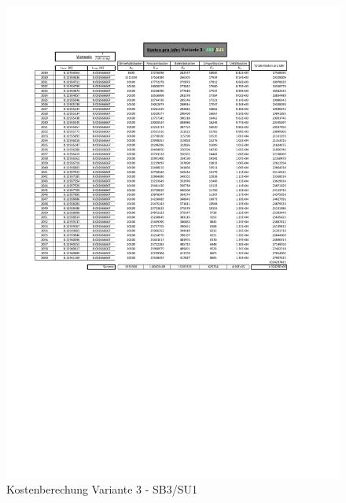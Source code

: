 \begin{figure}[h!]
	\centering
	\includegraphics[width=\textwidth]{figures/Anhang/f-00-A-V3-B3-U1}
	\caption{Kostenberechung Variante 3 - SB3/SU1}
\end{figure}

